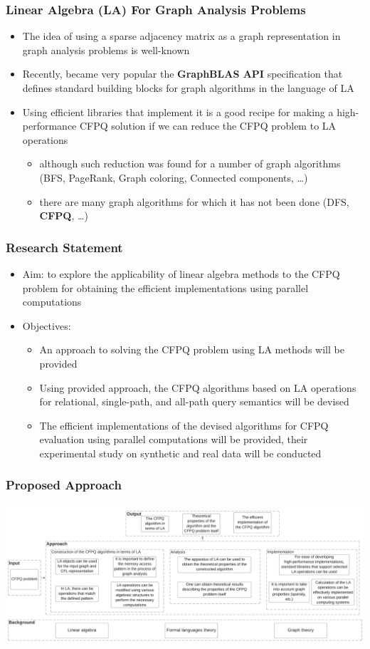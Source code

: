 \documentclass[xcolor=table,aspectratio=169]{beamer}
\begin{document}
\begin{frame}[fragile] \frametitle{Linear Algebra (LA) For Graph Analysis Problems}
	\begin{itemize}
		\item The idea of using a sparse adjacency
		matrix as a graph representation in graph analysis problems
		is well-known
		\item Recently, became very popular the \textbf{GraphBLAS API} specification that defines standard building blocks for graph
		algorithms in the language of LA
		\item Using efficient libraries that implement it is a good recipe for making a high-performance CFPQ
		solution if we can reduce the CFPQ problem to LA operations
		\begin{itemize}
			\item although such reduction was found for a number of graph
			algorithms (BFS, PageRank, Graph coloring, Connected components, \ldots)
			\item there are many graph algorithms for which it has not
			been done (DFS, \textbf{CFPQ}, \ldots)
		\end{itemize}
	\end{itemize}
\end{frame}

\begin{frame}[fragile] \frametitle{Research Statement}
	\begin{itemize}
		\item Aim: to explore the applicability of linear algebra methods to the CFPQ problem for obtaining the efficient implementations using parallel computations
		\item Objectives:
		\begin{itemize}
			\item An approach to solving the CFPQ problem using	LA methods will be provided
			\item Using provided approach, the CFPQ algorithms
			based on LA operations for relational, single-path,
			and all-path query semantics will be devised
			\item The efficient implementations of the devised algorithms
			for CFPQ evaluation using parallel computations will be provided, their experimental study on synthetic and real data will be conducted
		\end{itemize}
	\end{itemize}
\end{frame}


\begin{frame}[fragile] \frametitle{Proposed Approach}
		\centering
		\includegraphics[width=15.7cm]{pictures/approach.pdf}
\end{frame}
\end{document}
